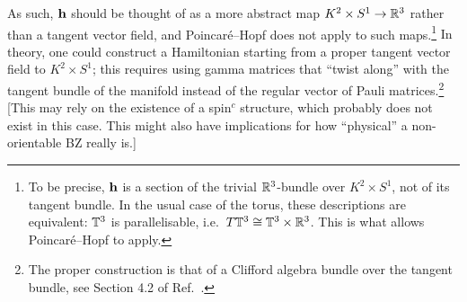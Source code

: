 As such, $\vb{h}$ should be thought of as a more abstract map $K^2\times S^1\to\mathbb{R}^3$ rather than a tangent vector field, and Poincar\'e--Hopf does not apply to such maps.\footnote{
	To be precise, $\vb{h}$ is a section of the trivial $\mathbb{R}^3$-bundle over $K^2\times S^1$, not of its tangent bundle. In the usual case of the torus, these descriptions are equivalent: $\mathbb{T}^3$ is parallelisable, i.e.\ $T\mathbb{T}^3\cong \mathbb{T}^3\times\mathbb{R}^3$. This is what allows Poincar\'e--Hopf to apply.}
{\color{red}
In theory, one could construct a Hamiltonian starting from a proper tangent vector field to $K^2\times S^1$; this requires using gamma matrices that ``twist along'' with the tangent bundle of the manifold instead of the regular vector of Pauli matrices.\footnote{\color{red}
	The proper construction is that of a Clifford algebra bundle over the tangent bundle, see Section 4.2 of Ref.\ \cite{Mathai_math-review}.}
[This may rely on the existence of a spin$^c$ structure, which probably does not exist in this case. This might also have implications for how ``physical'' a non-orientable BZ really is.]
}

 

